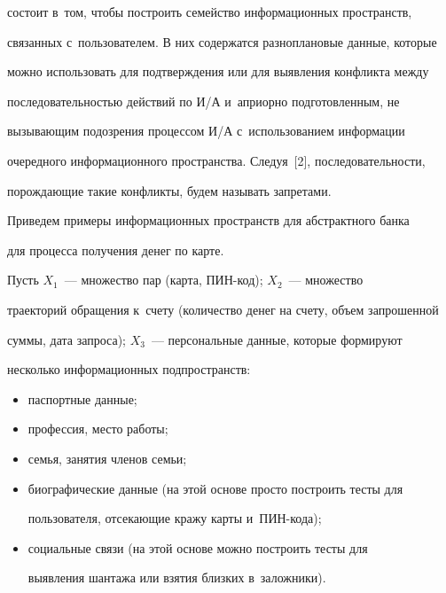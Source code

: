 состоит в~том, чтобы построить семейство информационных пространств, 


связанных с~пользователем. В них содержатся разноплановые данные, которые 


можно использовать для подтверждения или для выявления конфликта между 


последовательностью действий по И\!/\!А и~априорно подготовленным, не 


вызывающим подозрения процессом И\!/\!А с~использованием информации 


очередного информационного пространства. Следуя~[2], последовательности, 


порождающие такие конфликты, будем называть запретами.


  


  Приведем примеры информационных пространств для абстрактного банка 


для процесса получения денег по карте.


  


  Пусть $X_1$~--- множество пар (карта, ПИН-код); $X_2$~--- множество 


траекторий обращения к~счету (количество денег на счету, объем запрошенной 


суммы, дата запроса); $X_3$~--- персональные данные, которые формируют 


несколько информационных подпространств:


  \begin{itemize}


\item паспортные данные;


\item профессия, место работы;


\item семья, занятия членов семьи;


\item биографические данные (на этой основе просто построить тесты для 


пользователя, отсекающие кражу карты и~ПИН-кода);


\item социальные связи (на этой основе можно построить тесты для 


выявления шантажа или взятия близких в~заложники).


\end{itemize}





